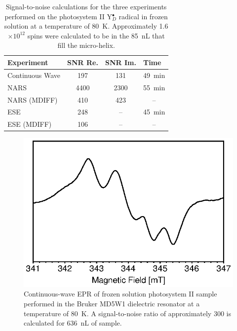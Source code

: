 \begin{table}[htbp]
\centering
\caption[Signal-to-noise calculations.]{Signal-to-noise calculations for the three experiments performed on the photosystem II Y$_D^\bullet$ radical in frozen solution at a temperature of 80~K. Approximately 1.6$\times10^{12}$ spins were calculated to be in the 85~nL that fill the micro-helix.}
\begin{tabular}{llll}
\multicolumn{1}{l|}{Experiment} & \multicolumn{1}{l|}{SNR Re.} & \multicolumn{1}{l|}{SNR Im.} & Time\\ \hline\hline
\multicolumn{1}{l|}{Continuous Wave} & \multicolumn{1}{c|}{197} & \multicolumn{1}{c|}{131} & \multicolumn{1}{c}{49~min} \\\hline
\multicolumn{1}{l|}{NARS} & \multicolumn{1}{c|}{4400} & \multicolumn{1}{c|}{2300} & \multicolumn{1}{c}{55~min} \\\hline
\multicolumn{1}{l|}{NARS (MDIFF)} & \multicolumn{1}{c|}{410} & \multicolumn{1}{c|}{423} & \multicolumn{1}{c}{--} \\\hline
\multicolumn{1}{l|}{ESE} & \multicolumn{1}{c|}{248} & \multicolumn{1}{c|}{--} & \multicolumn{1}{c}{45~min} \\\hline
\multicolumn{1}{l|}{ESE (MDIFF)} & \multicolumn{1}{c|}{106} & \multicolumn{1}{c|}{--} & \multicolumn{1}{c}{--}\\
\end{tabular}\label{table:snrcalc}
\end{table}

\begin{figure}[htbp]
\centering
\includegraphics{Kapitel/Appendix/Images/S5-BBYMD5.eps}
\caption[CW EPR of frozen solution photosystem II in the Bruker MD5W1.]{Continuous-wave EPR of frozen solution photosystem II sample performed in the Bruker MD5W1 dielectric resonator at a temperature of 80~K. A signal-to-noise ratio of approximately 300 is calculated for 636~nL of sample.}
\label{fig:BBYMD5}
\end{figure}

